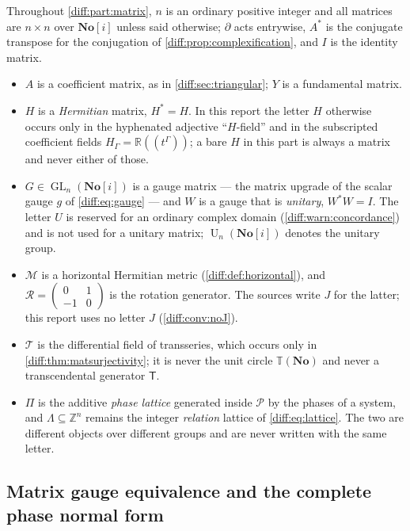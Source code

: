 \documentclass[11pt,letterpaper]{article}
\numberwithin{equation}{section}
\theoremstyle{definition}
\theoremstyle{remark}
\newcommand{\No}{\mathbf{No}}
\newcommand{\SC}{\mathbf{No}[i]}
\newcommand{\R}{\mathbb R}
\newcommand{\Z}{\mathbb Z}
\newcommand{\der}{\partial}
\newcommand{\Pcl}{\mathcal P}
\newcommand{\Tor}{\mathbb T}
\newcommand{\GL}{\operatorname{GL}}
\newcommand{\Un}{\operatorname{U}}
\newcommand{\Rot}{\mathcal R}
\newcommand{\Tser}{\mathcal T}
\begin{document}
\begin{convention}
\label{diff:conv:matalphabet}
Throughout \cref{diff:part:matrix}, $n$ is an ordinary positive integer and
all matrices are $n\times n$ over $\SC$ unless said otherwise; $\der$ acts
entrywise, $A^{*}$ is the conjugate transpose for the conjugation of
\cref{diff:prop:complexification}, and $I$ is the identity matrix.
\begin{itemize}[leftmargin=1.6em]
\item $A$ is a coefficient matrix, as in \cref{diff:sec:triangular};
$Y$ is a fundamental matrix.
\item $H$ is a \emph{Hermitian} matrix, $H^{*}=H$. In this report the letter
$H$ otherwise occurs only in the hyphenated adjective ``$H$-field'' and in the
subscripted coefficient fields $H_{\Gamma}=\R((t^{\Gamma}))$; a bare $H$ in
this part is always a matrix and never either of those.
\item $G\in\GL_{n}(\SC)$ is a gauge matrix --- the matrix upgrade of the
scalar gauge $g$ of \cref{diff:eq:gauge} --- and $W$ is a gauge that is
\emph{unitary}, $W^{*}W=I$. The letter $U$ is reserved for an ordinary complex
domain (\cref{diff:warn:concordance}) and is not used for a unitary matrix;
$\Un_{n}(\SC)$ denotes the unitary group.
\item $\mathcal M$ is a horizontal Hermitian metric
(\cref{diff:def:horizontal}), and $\Rot=\left(
\begin{smallmatrix}0&1\\-1&0\end{smallmatrix}\right)$ is the rotation
generator. The sources write $J$ for the latter; this report uses no letter
$J$ (\cref{diff:conv:noJ}).
\item $\Tser$ is the differential field of transseries, which occurs only in
\cref{diff:thm:matsurjectivity}; it is never the unit circle $\Tor(\No)$ and never
a transcendental generator $\mathsf T$.
\item $\Pi$ is the additive \emph{phase lattice} generated inside $\Pcl$ by
the phases of a system, and $\Lambda\subseteq\Z^{n}$ remains the integer
\emph{relation} lattice of \cref{diff:eq:lattice}. The two are different
objects over different groups and are never written with the same letter.
\end{itemize}
\end{convention}

\subsection{Matrix gauge equivalence and the complete phase normal form}
\label{diff:sub:matnormal}
\end{document}
